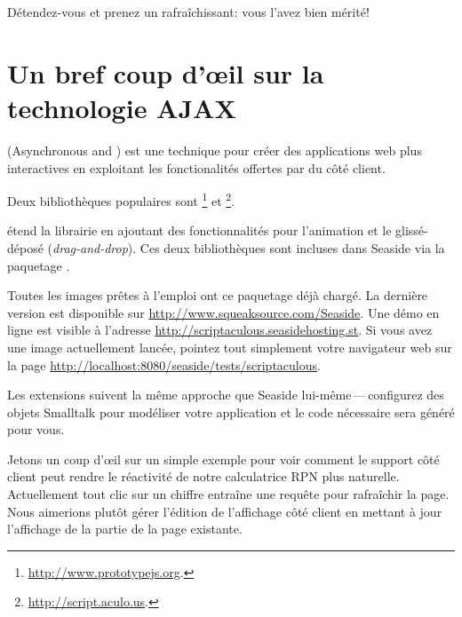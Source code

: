 \documentclass[a4paper,10pt,twoside]{book}
\begin{document}

Détendez-vous et prenez un rafraîchissant: vous l'avez bien mérité!


\section{Un bref coup d'\oe il sur la technologie AJAX}


 (Asynchronous  and ) est une
technique pour créer des applications web plus interactives en
exploitant les fonctionalités offertes par \jscript du côté client.

Deux bibliothèques \jscript{} populaires sont \ind{\pjs}\footnote{\url{http://www.prototypejs.org}.} et \ind{\sau}\footnote{\url{http://script.aculo.us}.}.


\sau{} étend la librairie \pjs{} en ajoutant des fonctionnalités pour
l'animation et le glissé-déposé (\emph{drag-and-drop}).
Ces deux bibliothèques sont incluses dans Seaside via la paquetage
.

Toutes les images prêtes à l'emploi ont ce paquetage déjà chargé. La
dernière version est disponible sur
\url{http://www.squeaksource.com/Seaside}.
Une démo en ligne est visible à l'adresse 
\url{http://scriptaculous.seasidehosting.st}.
Si vous avez une image actuellement lancée, pointez tout simplement
votre navigateur web sur la page
\url{http://localhost:8080/seaside/tests/scriptaculous}.

Les extensions \sau{} suivent la même approche que Seaside
lui-même\,---\,configurez des objets Smalltalk pour modéliser votre
application et le code \jscript{} nécessaire sera généré pour vous.

Jetons un coup d'\oe il sur un simple exemple pour voir comment le support
\jscript{} côté client peut rendre le réactivité de notre calculatrice
RPN plus naturelle.
Actuellement tout clic sur un chiffre entraîne une requête pour
rafraîchir la page. Nous aimerions plutôt gérer l'édition de
l'affichage côté client en mettant à jour l'affichage 
de la partie  de la page existante.
\end{document}
